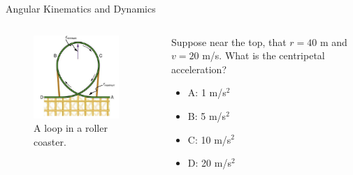 \documentclass{beamer}
\begin{document}
\begin{frame}{Angular Kinematics and Dynamics}
\begin{columns}[T]
\begin{column}{0.5\textwidth}
\begin{figure}
\centering
\includegraphics[width=0.9\textwidth]{figures/loop.png}
\caption{\label{fig:loop1} A loop in a roller coaster.}
\end{figure}
\end{column}
\begin{column}{0.5\textwidth}
\small
Suppose near the top, that $r = 40$ m and $v = 20$ m/s.  What is the centripetal acceleration?
\begin{itemize}
\item A: 1 m/s$^2$
\item B: 5 m/s$^2$
\item C: 10 m/s$^2$
\item D: 20 m/s$^2$
\end{itemize}
\end{column}
\end{columns}
\end{frame}
\end{document}
